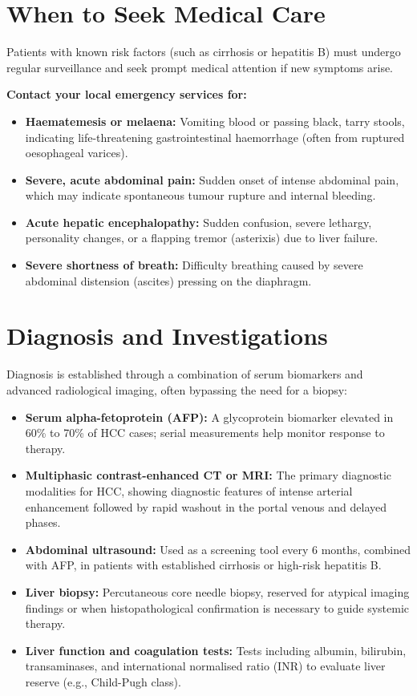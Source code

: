 \section*{When to Seek Medical Care}
Patients with known risk factors (such as cirrhosis or hepatitis B) must undergo regular surveillance and seek prompt medical attention if new symptoms arise.

\textbf{Contact your local emergency services for:}
\begin{itemize}
    \item \textbf{Haematemesis or melaena:} Vomiting blood or passing black, tarry stools, indicating life-threatening gastrointestinal haemorrhage (often from ruptured oesophageal varices).
    \item \textbf{Severe, acute abdominal pain:} Sudden onset of intense abdominal pain, which may indicate spontaneous tumour rupture and internal bleeding.
    \item \textbf{Acute hepatic encephalopathy:} Sudden confusion, severe lethargy, personality changes, or a flapping tremor (asterixis) due to liver failure.
    \item \textbf{Severe shortness of breath:} Difficulty breathing caused by severe abdominal distension (ascites) pressing on the diaphragm.
\end{itemize}

\section*{Diagnosis and Investigations}
Diagnosis is established through a combination of serum biomarkers and advanced radiological imaging, often bypassing the need for a biopsy:
\begin{itemize}
    \item \textbf{Serum alpha-fetoprotein (AFP):} A glycoprotein biomarker elevated in 60\% to 70\% of HCC cases; serial measurements help monitor response to therapy.
    \item \textbf{Multiphasic contrast-enhanced CT or MRI:} The primary diagnostic modalities for HCC, showing diagnostic features of intense arterial enhancement followed by rapid washout in the portal venous and delayed phases.
    \item \textbf{Abdominal ultrasound:} Used as a screening tool every 6 months, combined with AFP, in patients with established cirrhosis or high-risk hepatitis B.
    \item \textbf{Liver biopsy:} Percutaneous core needle biopsy, reserved for atypical imaging findings or when histopathological confirmation is necessary to guide systemic therapy.
    \item \textbf{Liver function and coagulation tests:} Tests including albumin, bilirubin, transaminases, and international normalised ratio (INR) to evaluate liver reserve (e.g., Child-Pugh class).
\end{itemize}

